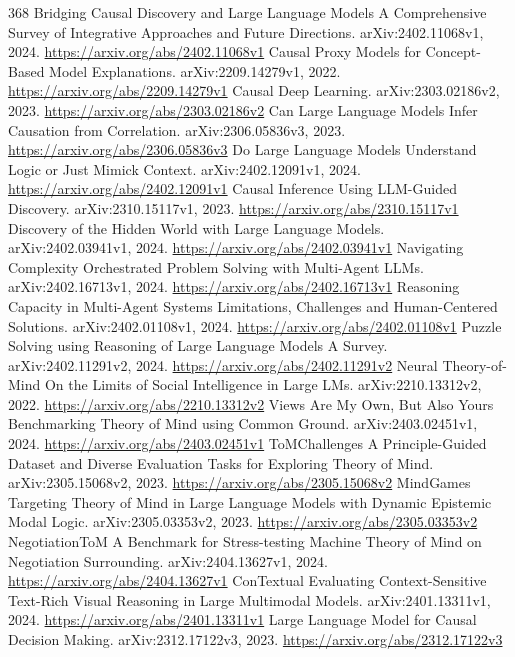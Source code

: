 \documentclass[11pt]{article}
\begin{document}
\begin{thebibliography}{368}
 Bridging Causal Discovery and Large Language Models A Comprehensive Survey of Integrative Approaches and Future Directions. arXiv:2402.11068v1, 2024. \url{https://arxiv.org/abs/2402.11068v1}
 Causal Proxy Models for Concept-Based Model Explanations. arXiv:2209.14279v1, 2022. \url{https://arxiv.org/abs/2209.14279v1}
 Causal Deep Learning. arXiv:2303.02186v2, 2023. \url{https://arxiv.org/abs/2303.02186v2}
 Can Large Language Models Infer Causation from Correlation. arXiv:2306.05836v3, 2023. \url{https://arxiv.org/abs/2306.05836v3}
 Do Large Language Models Understand Logic or Just Mimick Context. arXiv:2402.12091v1, 2024. \url{https://arxiv.org/abs/2402.12091v1}
 Causal Inference Using LLM-Guided Discovery. arXiv:2310.15117v1, 2023. \url{https://arxiv.org/abs/2310.15117v1}
 Discovery of the Hidden World with Large Language Models. arXiv:2402.03941v1, 2024. \url{https://arxiv.org/abs/2402.03941v1}
 Navigating Complexity Orchestrated Problem Solving with Multi-Agent LLMs. arXiv:2402.16713v1, 2024. \url{https://arxiv.org/abs/2402.16713v1}
 Reasoning Capacity in Multi-Agent Systems Limitations, Challenges and Human-Centered Solutions. arXiv:2402.01108v1, 2024. \url{https://arxiv.org/abs/2402.01108v1}
 Puzzle Solving using Reasoning of Large Language Models A Survey. arXiv:2402.11291v2, 2024. \url{https://arxiv.org/abs/2402.11291v2}
 Neural Theory-of-Mind On the Limits of Social Intelligence in Large LMs. arXiv:2210.13312v2, 2022. \url{https://arxiv.org/abs/2210.13312v2}
 Views Are My Own, But Also Yours Benchmarking Theory of Mind using Common Ground. arXiv:2403.02451v1, 2024. \url{https://arxiv.org/abs/2403.02451v1}
 ToMChallenges A Principle-Guided Dataset and Diverse Evaluation Tasks for Exploring Theory of Mind. arXiv:2305.15068v2, 2023. \url{https://arxiv.org/abs/2305.15068v2}
 MindGames Targeting Theory of Mind in Large Language Models with Dynamic Epistemic Modal Logic. arXiv:2305.03353v2, 2023. \url{https://arxiv.org/abs/2305.03353v2}
 NegotiationToM A Benchmark for Stress-testing Machine Theory of Mind on Negotiation Surrounding. arXiv:2404.13627v1, 2024. \url{https://arxiv.org/abs/2404.13627v1}
 ConTextual Evaluating Context-Sensitive Text-Rich Visual Reasoning in Large Multimodal Models. arXiv:2401.13311v1, 2024. \url{https://arxiv.org/abs/2401.13311v1}
 Large Language Model for Causal Decision Making. arXiv:2312.17122v3, 2023. \url{https://arxiv.org/abs/2312.17122v3}

\end{thebibliography}
\end{document}
